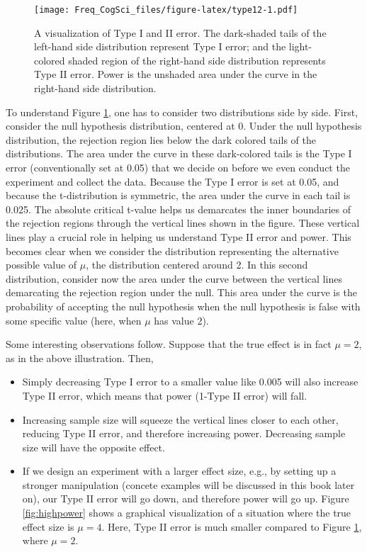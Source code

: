 \documentclass[12pt,]{krantz}
\providecommand{\tightlist}{%
  \setlength{\itemsep}{0pt}\setlength{\parskip}{0pt}}
\begin{document}
\begin{figure}
\centering
\texttt{[image: Freq\_CogSci\_files/figure-latex/type12-1.pdf]}
\caption{\label{fig:type12}A visualization of Type I and II error. The dark-shaded tails of the left-hand side distribution represent Type I error; and the light-colored shaded region of the right-hand side distribution represents Type II error. Power is the unshaded area under the curve in the right-hand side distribution.}
\end{figure}

To understand Figure \ref{fig:type12}, one has to consider two distributions side by side. First, consider the null hypothesis distribution, centered at 0. Under the null hypothesis distribution, the rejection region lies below the dark colored tails of the distributions. The area under the curve in these dark-colored tails is the Type I error (conventionally set at 0.05) that we decide on before we even conduct the experiment and collect the data. Because the Type I error is set at 0.05, and because the t-distribution is symmetric, the area under the curve in each tail is 0.025. The absolute critical t-value helps us demarcates the inner boundaries of the rejection regions through the vertical lines shown in the figure. These vertical lines play a crucial role in helping us understand Type II error and power. This becomes clear when we consider the distribution representing the alternative possible value of \(\mu\), the distribution centered around 2. In this second distribution, consider now the area under the curve between the vertical lines demarcating the rejection region under the null. This area under the curve is the probability of accepting the null hypothesis when the null hypothesis is false with some specific value (here, when \(\mu\) has value 2).

Some interesting observations follow. Suppose that the true effect is in fact \(\mu=2\), as in the above illustration. Then,

\begin{itemize}
\tightlist
\item
  Simply decreasing Type I error to a smaller value like 0.005 will also increase Type II error, which means that power (1-Type II error) will fall.
\item
  Increasing sample size will squeeze the vertical lines closer to each other, reducing Type II error, and therefore increasing power. Decreasing sample size will have the opposite effect.
\item
  If we design an experiment with a larger effect size, e.g., by setting up a stronger manipulation (concete examples will be discussed in this book later on), our Type II error will go down, and therefore power will go up. Figure \ref{fig:highpower} shows a graphical visualization of a situation where the true effect size is \(\mu=4\). Here, Type II error is much smaller compared to Figure \ref{fig:type12}, where \(\mu=2\).
\end{itemize}
\end{document}
